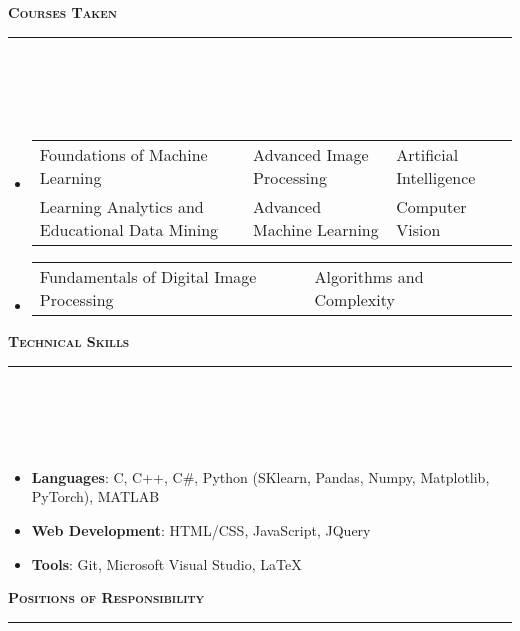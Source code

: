 \documentclass[a4paper,10pt]{article}
\newcommand{\lsep}{-0.5cm}
\newcommand{\resheading}[1]{{\small
        {
            \begin{minipage}
                {0.992\textwidth}\textbf{{\textsc{#1 \vphantom{p\^{E}} }}}
                \\[-0.3cm]
                \hrule
            \end{minipage}
            \\[-0.5cm]
        }
 }}
\begin{document}
\resheading{\textbf{\large Courses Taken }}\\[\lsep]
\\[-0.3cm]
\begin{itemize}
    \item[] \begin{tabular}{p{8cm}p{5cm}l }
    Foundations of Machine Learning & Advanced Image Processing  & Artificial Intelligence\\ 
    Learning Analytics and Educational Data Mining & Advanced Machine Learning   &  Computer Vision
    \end{tabular}
    \vspace{-0.25cm}
    \item[] \begin{tabular}{p{8cm}p{5cm}l }
    Fundamentals of Digital Image Processing & Algorithms and Complexity
    \end{tabular}
\end{itemize}
\vspace{-0.05cm}
\resheading{\textbf{\large Technical Skills}}\\[\lsep] 
\\[-0.3cm]
\begin{itemize}
  \item \textbf{Languages}: C, C++, C\#, Python (SKlearn, Pandas, Numpy, Matplotlib, PyTorch), MATLAB\\[-0.6cm]
  \item \textbf{Web Development}: HTML/CSS,
  JavaScript, JQuery\\[-0.6cm]
  \item \textbf{Tools}: Git, Microsoft Visual Studio, \LaTeX \\[-0.6cm]
\end{itemize}
\vspace{0.1cm}
\resheading{\textbf{\large Positions of Responsibility}}\\[\lsep] 
\\[-0.3cm]
\end{document}
